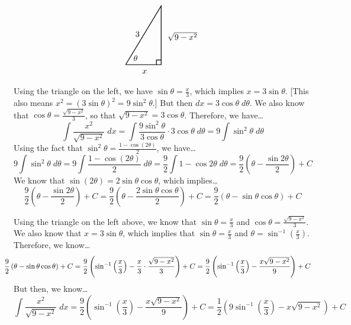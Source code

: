 \documentclass[12pt,letterpaper]{exam}
\begin{document}
\begin{questions}
{\[\begin{tikzpicture}
	\draw[line width=0.03cm] (0,0) -- (1.5,0) -- (1.5,2.5) -- (0,0);
	\draw[line width=0.03cm] (1.3,0) -- (1.3,0.2) -- (1.5,0.2);
	\node at (0.8,-0.3) {$x$};
	\node at (2.4,1.2) {$\sqrt{9 - x^2}$};
	\node at (0.5,1.3) {$3$};
	\node at (0.42,0.28) {$\theta$};
	\end{tikzpicture}
	\] \par
Using the triangle on the left, we have $\sin \theta= \frac{x}{3}$, which implies $x= 3 \sin \theta$. [This also means $x^2= (3 \sin \theta)^2= 9 \sin^2 \theta$.] But then $dx= 3 \cos \theta \;d\theta$. We also know that $\cos \theta= \frac{\sqrt{9 - x^2}}{3}$, so that $\sqrt{9 - x^2}= 3 \cos \theta$. Therefore, we have\dots
	\[
	\int \dfrac{x^2}{\sqrt{9 - x^2}} \;dx= \int \dfrac{9 \sin^2 \theta}{3 \cos \theta} \cdot 3 \cos \theta \;d\theta= 9 \int \sin^2 \theta \;d\theta
	\]
Using the fact that $\sin^2 \theta= \frac{1 - \cos(2\theta)}{2}$, we have\dots
	\[
	9 \int \sin^2 \theta \;d\theta= 9 \int \dfrac{1 - \cos(2\theta)}{2} \;d\theta= \dfrac{9}{2} \int 1 - \cos 2 \theta \;d\theta= \dfrac{9}{2} \left( \theta - \dfrac{\sin 2 \theta}{2} \right) + C
	\]
We know that $\sin(2 \theta)= 2 \sin \theta \cos \theta$, which implies\dots 
	\[
	\dfrac{9}{2} \left( \theta - \dfrac{\sin 2 \theta}{2} \right) + C= \dfrac{9}{2} \left( \theta - \dfrac{2 \sin \theta \cos \theta}{2} \right) + C= \dfrac{9}{2} \left( \theta - \sin \theta \cos \theta \right) + C
	\]

Using the triangle on the left above, we know that $\sin \theta= \frac{x}{3}$ and $\cos \theta= \frac{\sqrt{9 - x^2}}{3}$. We also know that $x= 3 \sin \theta$, which implies that $\sin \theta= \frac{x}{3}$ and $\theta= \sin^{-1} \left( \frac{x}{3} \right)$. Therefore, we know\dots
	\[
	\hspace{-0.5cm} \dfrac{9}{2} \left( \theta - \sin \theta \cos \theta \right) + C= \dfrac{9}{2} \left( \sin^{-1} \left( \dfrac{x}{3} \right) - \dfrac{x}{3} \cdot \dfrac{\sqrt{9 - x^2}}{3} \right) + C= \dfrac{9}{2} \left( \sin^{-1} \left( \dfrac{x}{3} \right) - \dfrac{x \sqrt{9 - x^2}}{9} \right) + C
	\]
But then, we know\dots
	\[
	\int \dfrac{x^2}{\sqrt{9 - x^2}} \;dx= \boxed{\dfrac{9}{2} \left( \sin^{-1} \left( \dfrac{x}{3} \right) - \dfrac{x \sqrt{9 - x^2}}{9} \right) + C}=  \dfrac{1}{2} \left( 9 \sin^{-1} \left( \dfrac{x}{3} \right) - x \sqrt{9 - x^2} \right) + C
	\]
}

\remove{\newpage

}
\end{questions}
\end{document}

